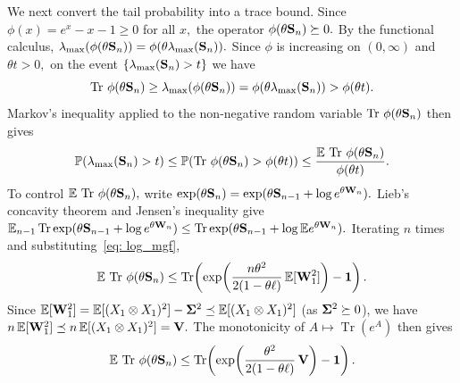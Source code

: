 \documentclass[mnsc]{informs3aa} %
\DeclareMathOperator{\Tr}{Tr}
\newcommand{\bSigma}{\bold{\Sigma}}
\newcommand{\idty}{\mathbf{1}}
\begin{document}
We next convert the tail probability into a trace bound. Since $\phi(x)=e^x-x-1\geq 0$ for all $x,$ the operator $\phi(\theta\bold{S}_n)\succeq 0.$ By the functional calculus, $\lambda_{\max}(\phi(\theta\bold{S}_n))=\phi(\theta\lambda_{\max}(\bold{S}_n)).$ Since $\phi$ is increasing on $(0,\infty)$ and $\theta t>0,$ on the event $\{\lambda_{\max}(\bold{S}_n)>t\}$ we have
\[\Tr\,\phi(\theta\bold{S}_n)\geq\lambda_{\max}(\phi(\theta\bold{S}_n))=\phi(\theta\lambda_{\max}(\bold{S}_n))>\phi(\theta t).\]
Markov's inequality applied to the non-negative random variable $\Tr\,\phi(\theta\bold{S}_n)$ then gives
\begin{equation}\label{eq: markov_step}
\mathbb{P}(\lambda_{\max}(\bold{S}_n)>t)\leq\mathbb{P}(\Tr\,\phi(\theta\bold{S}_n)>\phi(\theta t))\leq\frac{\mathbb{E}\,\Tr\,\phi(\theta \bold{S}_n)}{\phi(\theta t)}.
\end{equation}
To control $\mathbb{E}\,\Tr\,\phi(\theta\bold{S}_n),$ write $\exp(\theta \bold{S}_n)=\exp(\theta \bold{S}_{n-1}+\log e^{\theta \bold{W}_n}).$ Lieb's concavity theorem and Jensen's inequality give $\mathbb{E}_{n-1}\Tr\exp(\theta \bold{S}_{n-1}+\log e^{\theta \bold{W}_n})\leq\Tr\exp(\theta \bold{S}_{n-1}+\log\mathbb{E}e^{\theta \bold{W}_n}).$ Iterating $n$ times and substituting~\eqref{eq: log_mgf},
\[\mathbb{E}\,\Tr\,\phi(\theta \bold{S}_n)\leq\Tr\!\left(\exp\!\left(\frac{n\theta^2}{2(1-\theta \ell)}\,\mathbb{E}[\bold{W}_1^2]\right)-\idty\right).\]
Since $\mathbb{E}[\bold{W}_1^2]=\mathbb{E}[(X_1\otimes X_1)^2]-\bSigma^2\preceq\mathbb{E}[(X_1\otimes X_1)^2]$ (as $\bSigma^2\succeq 0$), we have $n\,\mathbb{E}[\bold{W}_1^2]\preceq n\,\mathbb{E}[(X_1\otimes X_1)^2]=\bold{V}.$ The monotonicity of $A\mapsto\Tr(e^A)$ then gives
\begin{equation}\label{eq: trace_iter}
\mathbb{E}\,\Tr\,\phi(\theta \bold{S}_n)\leq\Tr\!\left(\exp\!\left(\frac{\theta^2}{2(1-\theta \ell)}\,\bold{V}\right)-\idty\right).
\end{equation}
\end{document}
